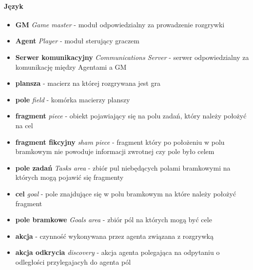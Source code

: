 \documentclass[Dokumentacja.tex]{subfiles}
\begin{document}
\paragraph{Język}
\begin{itemize}
    \item \textbf{GM} \textit{Game master} - moduł odpowiedzialny za prowadzenie rozgrywki
    \item \textbf{Agent} \textit{Player} - moduł sterujący graczem
    \item \textbf{Serwer komunikacyjny} \textit{Communications Server} - serwer odpowiedzialny za komunikację między Agentami a GM
    \item \textbf{plansza} - macierz na której rozgrywana jest gra
    \item \textbf{pole} \textit{field} - komórka macierzy planszy
    \item \textbf{fragment} \textit{piece} - obiekt pojawiający się na polu zadań, który należy położyć na cel
    \item \textbf{fragment fikcyjny} \textit{sham piece} - fragment który po położeniu w polu bramkowym nie powoduje informacji zwrotnej czy pole było celem
    \item \textbf{pole zadań} \textit{Tasks area} - zbiór pul niebędących polami bramkowymi na których mogą pojawić się fragmenty
    \item \textbf{cel} \textit{goal} - pole znajdujące się w polu bramkowym na które należy położyć fragment
    \item \textbf{pole bramkowe} \textit{Goals area} - zbiór pól na których mogą być cele
    \item \textbf{akcja} - czynność wykonywana przez agenta związana z rozgrywką
    \item \textbf{akcja odkrycia} \textit{discovery} - akcja agenta polegająca na odpytaniu o odległości przylegajacyh do agenta pól
\end{itemize}
\end{document}
